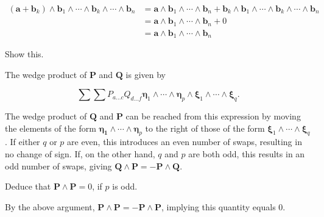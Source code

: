 \documentclass[../the-road-to-reality.tex]{subfiles}
\begin{document}
\begin{questions}
\begin{solution}
        \begin{align*}
                (\mathbf{a} + \mathbf{b}_k)\wedge\mathbf{b}_1\wedge\cdots\wedge\mathbf{b}_k\wedge\cdots\wedge\mathbf{b}_n &= \mathbf{a}\wedge\mathbf{b}_1\wedge\cdots\wedge\mathbf{b}_n + \mathbf{b}_k\wedge\mathbf{b}_1\wedge\cdots\wedge\mathbf{b}_k\wedge\cdots\wedge\mathbf{b}_n \\
                &= \mathbf{a}\wedge\mathbf{b}_1\wedge\cdots\wedge\mathbf{b}_n + 0 \\
                &= \mathbf{a}\wedge\mathbf{b}_1\wedge\cdots\wedge\mathbf{b}_n
        \end{align*}
\end{solution}

\question Show this.

\begin{solution}
        The wedge product of $\mathbf{P}$ and $\mathbf{Q}$ is given by

	\[
        \sum\sum P_{a\dots{c}}Q_{d\dots{f}}\mathbf{\eta}_1\wedge\cdots\wedge\mathbf{\eta}_p\wedge\mathbf{\xi}_1\wedge\cdots\wedge\mathbf{\xi}_q
	.\] 

        The wedge product of $\mathbf{Q}$ and $\mathbf{P}$ can be reached from this expression by moving the elements of the form $\mathbf{\eta_1}\wedge\cdots\wedge\mathbf{\eta}_p$ to the right of those of the form $\mathbf{\xi}_1\wedge\cdots\wedge\mathbf{\xi}_q$. If either $q$ or $p$ are even, this introduces an even number of swaps, resulting in no change of sign. If, on the other hand, $q$ and $p$ are both odd, this results in an odd number of swaps, giving $\mathbf{Q}\wedge\mathbf{P} = -\mathbf{P}\wedge\mathbf{Q}$.
\end{solution}

\question Deduce that $\mathbf{P}\wedge\mathbf{P} = 0$, if $p$ is odd.

\begin{solution}
        By the above argument, $\mathbf{P}\wedge\mathbf{P} = -\mathbf{P}\wedge\mathbf{P}$, implying this quantity equals $0$.
\end{solution}

\end{questions}
	
\end{document}
